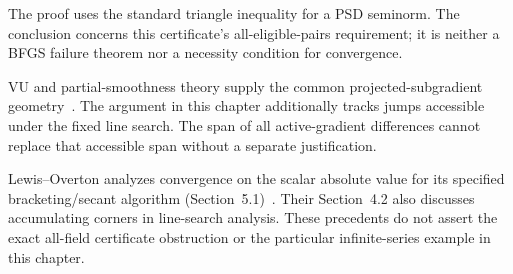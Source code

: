 The proof uses the standard triangle inequality for a PSD seminorm. The conclusion concerns this certificate's all-eligible-pairs requirement; it is neither a BFGS failure theorem nor a necessity condition for convergence.

VU and partial-smoothness theory supply the common projected-subgradient geometry~\cite{geom_Lewis2002,LL}. The argument in this chapter additionally tracks jumps accessible under the fixed line search. The span of all active-gradient differences cannot replace that accessible span without a separate justification.

Lewis--Overton analyzes convergence on the scalar absolute value for its specified bracketing/secant algorithm (Section~5.1)~\cite{LO}. Their Section~4.2 also discusses accumulating corners in line-search analysis. These precedents do not assert the exact all-field certificate obstruction or the particular infinite-series example in this chapter.
